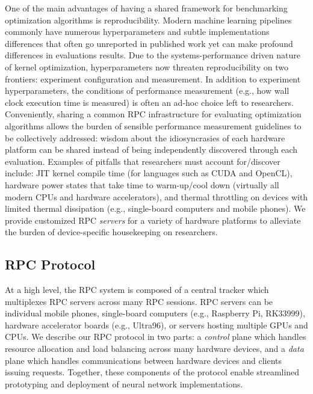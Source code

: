 One of the main advantages of having a shared framework for benchmarking optimization algorithms is reproducibility.
Modern machine learning pipelines commonly have numerous hyperparameters and subtle implementations differences that often go unreported in published work yet can make profound differences in evaluations results.
Due to the systems-performance driven nature of kernel optimization, hyperparameters now threaten reproducibility on two frontiers: experiment configuration and measurement.
In addition to experiment hyperparameters, the conditions of performance measurement (e.g., how wall clock execution time is measured) is often an ad-hoc choice left to researchers. Conveniently, sharing a common RPC infrastructure for evaluating optimization algorithms allows the burden of sensible performance measurement guidelines to be collectively addressed: wisdom about the idiosyncrasies of each hardware platform can be shared instead of being independently discovered through each evaluation.
Examples of pitfalls that researchers must account for/discover include: JIT kernel compile time (for languages such as CUDA and OpenCL), hardware power states that take time to warm-up/cool down (virtually all modern CPUs and hardware accelerators), and thermal throttling on devices with limited thermal dissipation (e.g., single-board computers and mobile phones).
We provide customized RPC \emph{servers} for a variety of hardware platforms to alleviate the burden of device-specific housekeeping on researchers.



\subsection{RPC Protocol}
At a high level, the RPC system is composed of a central tracker which multiplexes RPC servers across many RPC sessions.
RPC servers can be individual mobile phones, single-board computers (e.g., Raspberry Pi, RK33999), hardware accelerator boards (e.g., Ultra96), or servers hosting multiple GPUs and CPUs.
We describe our RPC protocol in two parts: a \emph{control} plane which handles resource allocation and load balancing across many hardware devices, and a \emph{data} plane which handles communications between hardware devices and clients issuing requests.
Together, these components of the protocol enable streamlined prototyping and deployment of neural network implementations.
